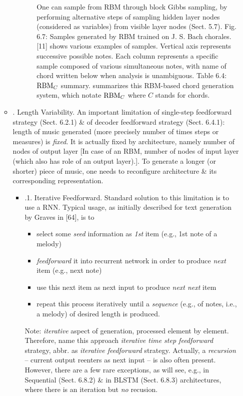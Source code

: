 \documentclass{article}
\begin{document}
\begin{itemize}
\begin{itemize}
\begin{itemize}
\begin{itemize}
				One can sample from RBM through block Gibbs sampling, by performing alternative steps of sampling hidden layer nodes (considered as variables) from visible layer nodes (Sect. 5.7). {\sf Fig. 6.7: Samples generated by RBM trained on {\sc J. S. Bach} chorales. [11]} shows various examples of samples. Vertical axis represents successive possible notes. Each column represents a specific sample composed of various simultaneous notes, with name of chord written below when analysis is unambiguous. {\sf Table 6.4: ${\rm RBM}_C$ summary.} summarizes this RBM-based chord generation system, which notate ${\rm RBM}_C$ where $C$ stands for chords.
			\end{itemize}
		\end{itemize}
		\item {. Length Variability.} An important limitation of single-step feedforward strategy (Sect. 6.2.1) \& of decoder feedforward strategy (Sect. 6.4.1): length of music generated (more precisely number of times steps or measures) is {\it fixed}. It is actually fixed by architecture, namely number of nodes of output layer [In case of an RBM, number of nodes of input layer (which also has role of an output layer).]. To generate a longer (or shorter) piece of music, one needs to reconfigure architecture \& its corresponding representation.
		\begin{itemize}
			\item {.1. Iterative Feedforward.} Standard solution to this limitation is to use a RNN. Typical usage, as initially described for text generation by {\sc Graves} in [64], is to
			\begin{itemize}
				\item select some {\it seed} information as {\it1st} item (e.g., 1st note of a melody)
				\item {\it feedforward} it into recurrent network in order to produce {\it next} item (e.g., next note)
				\item use this next item as next input to produce {\it next next} item
				\item repeat this process iteratively until a {\it sequence} (e.g., of notes, i.e., a melody) of desired length is produced.
			\end{itemize}
			Note: {\it iterative} aspect of generation, processed element by element. Therefore, name this approach {\it iterative time step feedforward} strategy, abbr. as {\it iterative feedforward} strategy. Actually, a {\it recursion} -- current output reenters as next input -- is also often present. However, there are a few rare exceptions, as will see, e.g., in Sequential (Sect. 6.8.2) \& in BLSTM (Sect. 6.8.3) architectures, where there is an iteration but {\it no} recusion.
			

\end{itemize}
\end{itemize}
\end{itemize}
\end{document}
